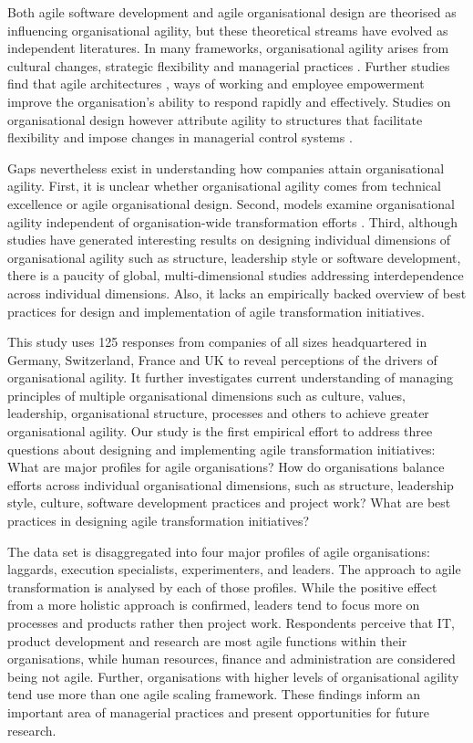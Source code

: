 \documentclass{article}
\begin{document}
Both agile software development and agile organisational design are theorised as influencing organisational agility, but these theoretical streams have evolved as independent literatures. In many frameworks, organisational agility arises from cultural changes, strategic flexibility and managerial practices \cite{wendler2013, Kalenda2018}. Further studies find that agile architectures \cite{leffingwell2008principles}, ways of working  \cite{Lindsjorn2016} and employee empowerment \cite{menon2001} improve the organisation's ability to respond rapidly and effectively. Studies on organisational design however attribute agility to structures that facilitate flexibility and impose changes in managerial control systems \cite{bernstein2016, kotter2012accelerate}.

Gaps nevertheless exist in understanding how companies attain organisational agility. First, it is unclear whether organisational agility comes from technical excellence or agile organisational design. Second, models examine organisational agility independent of organisation-wide transformation efforts \cite{mathiassen2006, ambrose2004}. Third, although studies have generated interesting results on designing individual dimensions of organisational agility such as structure, leadership style or software development, there is a paucity of global, multi-dimensional studies addressing interdependence across individual dimensions. Also, it lacks an empirically backed overview of best practices for design and implementation of agile transformation initiatives.

This study uses 125 responses from companies of all sizes headquartered in Germany, Switzerland, France and UK to reveal perceptions of the drivers of organisational agility. It further investigates current understanding of managing principles of multiple organisational dimensions such as culture, values, leadership, organisational structure, processes and others to achieve greater organisational agility. Our study is the first empirical effort to address three questions about designing and implementing agile transformation initiatives: What are major profiles for agile organisations? How do organisations balance efforts across individual organisational dimensions, such as structure, leadership style, culture, software development practices and project work? What are best practices in designing agile transformation initiatives?

The data set is disaggregated into four major profiles of agile organisations: laggards, execution specialists, experimenters, and leaders. The approach to agile transformation is analysed by each of those profiles. While the positive effect from a more holistic approach is confirmed, leaders tend to focus more on processes and products rather then project work. Respondents perceive that IT, product development and research are most agile functions within their organisations, while human resources, finance and administration are considered being not agile. Further, organisations with higher levels of organisational agility tend use more than one agile scaling framework. These findings inform an important area of managerial practices and present opportunities for future research.
\end{document}
